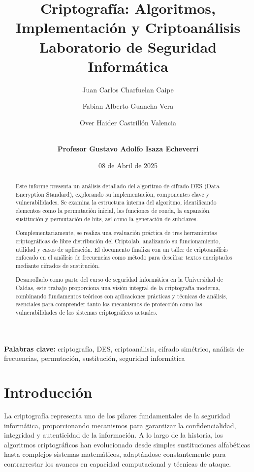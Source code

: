 \documentclass[12pt,a4paper]{article}
\begin{document}
\title{\LARGE \textbf{
		Criptografía: Algoritmos, Implementación y Criptoanálisis
	}\\\vspace{0.5cm}\Large
	Laboratorio de Seguridad Informática
}

\author[1]{Juan Carlos Charfuelan Caipe}
\author[2]{Fabian Alberto Guancha Vera}
\author[3]{Over Haider Castrillón Valencia}



\author[]{\\\textbf{Profesor Gustavo Adolfo Isaza Echeverri}}


\date{08 de Abril de 2025}

\maketitle

\begin{abstract}
	Este informe presenta un análisis detallado del algoritmo de cifrado DES (Data Encryption Standard), explorando su implementación, componentes clave y vulnerabilidades. Se examina la estructura interna del algoritmo, identificando elementos como la permutación inicial, las funciones de ronda, la expansión, sustitución y permutación de bits, así como la generación de subclaves.

	Complementariamente, se realiza una evaluación práctica de tres herramientas criptográficas de libre distribución del Criptolab, analizando su funcionamiento, utilidad y casos de aplicación. El documento finaliza con un taller de criptoanálisis enfocado en el análisis de frecuencias como método para descifrar textos encriptados mediante cifrados de sustitución.

	Desarrollado como parte del curso de seguridad informática en la Universidad de Caldas, este trabajo proporciona una visión integral de la criptografía moderna, combinando fundamentos teóricos con aplicaciones prácticas y técnicas de análisis, esenciales para comprender tanto los mecanismos de protección como las vulnerabilidades de los sistemas criptográficos actuales.
\end{abstract}

\textbf{Palabras clave:} criptografía, DES, criptoanálisis, cifrado simétrico, análisis de frecuencias, permutación, sustitución, seguridad informática

\section{Introducción}
La criptografía representa uno de los pilares fundamentales de la seguridad informática, proporcionando mecanismos para garantizar la confidencialidad, integridad y autenticidad de la información. A lo largo de la historia, los algoritmos criptográficos han evolucionado desde simples sustituciones alfabéticas hasta complejos sistemas matemáticos, adaptándose constantemente para contrarrestar los avances en capacidad computacional y técnicas de ataque.
\end{document}
